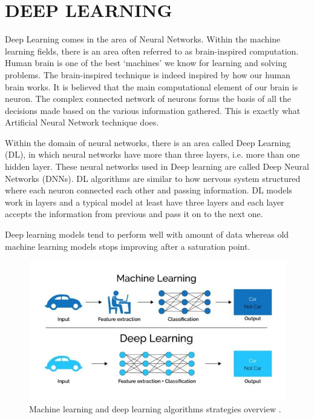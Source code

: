\documentclass{article}
\begin{document}
\section{DEEP LEARNING}
Deep Learning comes in the area of Neural Networks.
Within the machine learning fields, there is an area often referred to as brain-inspired computation. Human brain is one of the best ‘machines’ we know for learning and solving problems. The brain-inspired technique is indeed inspired by how our human brain works. It is believed that the main computational element of our brain is neuron. The complex connected network of neurons forms the basis of all the decisions made based on the various information gathered. This is exactly what Artificial Neural Network technique does.

Within the domain of neural networks, there is an area called Deep Learning (DL), in which neural networks have more than three layers, i.e. more than one hidden layer. These neural networks used in Deep learning are called Deep Neural Networks (DNNs). DL algorithms are similar to how nervous system structured where each neuron connected each other and passing information. DL models work in layers and a typical model at least have three layers and each layer accepts the information from previous and pass it on to the next one.

Deep learning models tend to perform well with amount of data whereas old machine learning models stops improving after a saturation point.
\begin{figure}[h]
\centering
\includegraphics[width=1\textwidth]{image4.png}
\caption{Machine learning and deep learning algorithms strategies overview \cite{thakur2021fundamentals}.}
\label{fig: Machine learning and deep learning algorithms.}
\end{figure}
\end{document}
